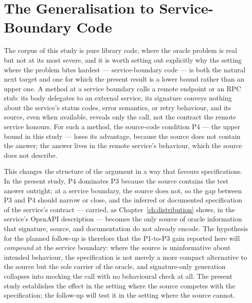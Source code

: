 \section{The Generalisation to Service-Boundary Code}
\label{sec:tg-service}

The corpus of this study is pure library code, where the oracle problem is real
but not at its most severe, and it is worth setting out explicitly why the setting
where the problem bites hardest --- service-boundary code --- is both the natural
next target and one for which the present result is a lower bound rather than an
upper one. A method at a service boundary calls a remote endpoint or an RPC stub:
its body delegates to an external service, its signature conveys nothing about the
service's status codes, error semantics, or retry behaviour, and its source, even
when available, reveals only the call, not the contract the remote service
honours. For such a method, the source-code condition P4 --- the upper bound in
this study --- loses its advantage, because the source does not contain the answer;
the answer lives in the remote service's behaviour, which the source does not
describe.

This changes the structure of the argument in a way that favours specifications. In
the present study, P4 dominates P3 because the source contains the test answer
outright; at a service boundary, the source does not, so the gap between P3 and P4
should narrow or close, and the inferred or documented specification of the
service's contract --- carried, as Chapter~\ref{ch:distribution} shows, in the
service's OpenAPI description --- becomes the only source of oracle information
that signature, source, and documentation do not already encode. The hypothesis
for the planned follow-up is therefore that the P1-to-P3 gain reported here will
\emph{compound} at the service boundary: where the source is uninformative about
intended behaviour, the specification is not merely a more compact alternative to
the source but the sole carrier of the oracle, and signature-only generation
collapses into mocking the call with no behavioural check at all. The present study
establishes the effect in the setting where the source competes with the
specification; the follow-up will test it in the setting where the source cannot.
